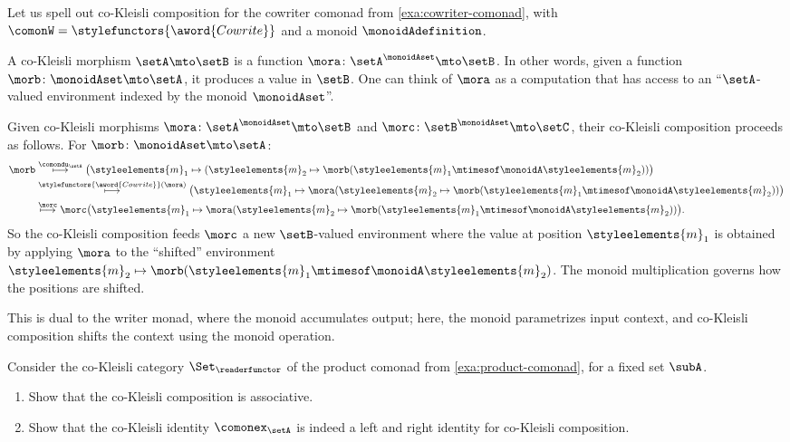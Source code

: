 \begin{example}
\label{exa:cokleisli-cowriter}

Let us spell out co-Kleisli composition for the cowriter comonad from \cref{exa:cowriter-comonad}, with $\comonW = \stylefunctors{\aword{Cowrite}}$ and a monoid $\monoidAdefinition$.

A co-Kleisli morphism $\setA \mto \setB$ is a function $\mora \colon \setA^{\monoidAset} \mto \setB$. In other words, given a function $\morb \colon \monoidAset \mto \setA$, it produces a value in $\setB$. One can think of $\mora$ as a computation that has access to an ``$\setA$-valued environment indexed by the monoid $\monoidAset$''.

Given co-Kleisli morphisms $\mora \colon \setA^{\monoidAset} \mto \setB$ and $\morc \colon \setB^{\monoidAset} \mto \setC$, their co-Kleisli composition proceeds as follows. For $\morb \colon \monoidAset \mto \setA$:
\begin{equation*}
\begin{split}
\morb
& \overset{\comondu_\setA}{\longmapsto} \bigl(\styleelements{m}_1 \mapsto (\styleelements{m}_2 \mapsto \morb(\styleelements{m}_1 \mtimesof\monoidA \styleelements{m}_2))\bigr) \\
& \overset{\stylefunctors{\aword{Cowrite}}(\mora)}{\longmapsto} \bigl(\styleelements{m}_1 \mapsto \mora(\styleelements{m}_2 \mapsto \morb(\styleelements{m}_1 \mtimesof\monoidA \styleelements{m}_2))\bigr) \\
& \overset{\morc}{\longmapsto} \morc\bigl(\styleelements{m}_1 \mapsto \mora(\styleelements{m}_2 \mapsto \morb(\styleelements{m}_1 \mtimesof\monoidA \styleelements{m}_2))\bigr).
\end{split}
\end{equation*}
So the co-Kleisli composition feeds $\morc$ a new $\setB$-valued environment where the value at position $\styleelements{m}_1$ is obtained by applying $\mora$ to the ``shifted'' environment $\styleelements{m}_2 \mapsto \morb(\styleelements{m}_1 \mtimesof\monoidA \styleelements{m}_2)$. The monoid multiplication governs how the positions are shifted.

This is dual to the writer monad, where the monoid accumulates output; here, the monoid parametrizes input context, and co-Kleisli composition shifts the context using the monoid operation.
\end{example}


\begin{gradedexercise}
    \label{ex:ProductComonadCoKleisli}
    Consider the co-Kleisli category $\Set_\readerfunctor$ of the product comonad from \cref{exa:product-comonad}, for a fixed set $\subA$.
    \begin{enumerate}
        \item Show that the co-Kleisli composition is associative.
        \item Show that the co-Kleisli identity $\comonex_\setA$ is indeed a left and right identity for co-Kleisli composition.
    \end{enumerate}
\end{gradedexercise}

